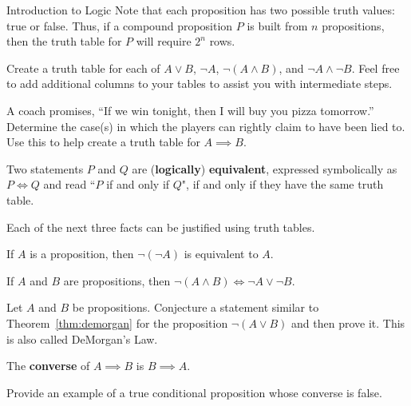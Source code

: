 \begin{section}{Introduction to Logic}
Note that each proposition has two possible truth values: true or false. Thus, if a compound proposition $P$ is built from $n$ propositions, then the truth table for $P$ will require $2^n$ rows.

\begin{exercise}
Create a truth table for each of $A \vee B$, $\neg A$, $\neg (A \wedge B)$, and $\neg A \wedge \neg B$.  Feel free to add additional columns to your tables to assist you with intermediate steps.
\end{exercise}

\begin{problem}
A coach promises, ``If we win tonight, then I will buy you pizza tomorrow.''  Determine the case(s) in which the players can rightly claim to have been lied to. Use this to help create a truth table for $A \implies B$.
\end{problem}

\begin{definition}
Two statements $P$ and $Q$ are (\textbf{logically}) \textbf{equivalent}, expressed symbolically as $\boxed{P\iff Q}$ and read ``$P$ if and only if $Q$", if and only if they have the same truth table.
\end{definition}

Each of the next three facts can be justified using truth tables.

\begin{theorem}
If $A$ is a proposition, then $\neg(\neg A)$ is equivalent to $A$.
\end{theorem}

\begin{theorem}\label{thm:demorgan}
If $A$ and $B$ are propositions, then $\neg(A \wedge B) \iff \neg A \vee \neg B$.
\end{theorem}

\begin{problem}
Let $A$ and $B$ be propositions.  Conjecture a statement similar to Theorem~\ref{thm:demorgan} for the proposition $\neg(A\vee B)$ and then prove it. This is also called DeMorgan's Law.
\end{problem}

\begin{definition}\label{def:converse}
The \textbf{converse} of $A \implies B$ is $B \implies A$.
\end{definition}

\begin{exercise}
Provide an example of a true conditional proposition whose converse is false.
\end{exercise}


\end{section}
